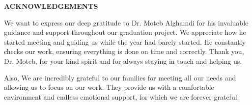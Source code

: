 \newpage

\setcounter{page}{2}
\renewcommand{\thepage}{\roman{page}}


\begin{center}
    \Large\textbf{ACKNOWLEDGEMENTS}
\end{center}
\vspace{6pt}

We want to express our deep gratitude to Dr. Moteb Alghamdi for his invaluable guidance and support throughout our graduation project. We appreciate how he started meeting and guiding us while the year had barely started. He constantly checks our work, ensuring everything is done on time and correctly. Thank you, Dr. Moteb, for your kind spirit and for always staying in touch and helping us.


Also, We are incredibly grateful to our families for meeting all our needs and allowing us to focus on our work. They provide us with a comfortable environment and endless emotional support, for which we are forever grateful.
